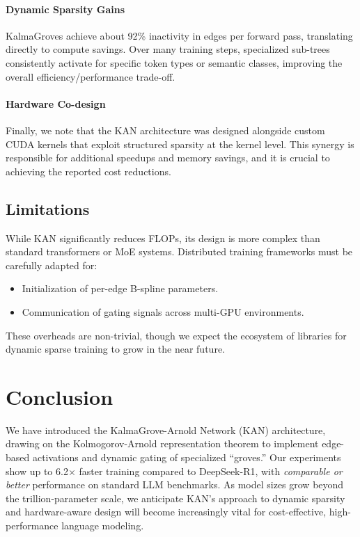 \documentclass[twocolumn]{article}
\begin{document}
\paragraph{Dynamic Sparsity Gains}
KalmaGroves achieve about 92\% inactivity in edges per forward pass, translating directly to compute savings. Over many training steps, specialized sub-trees consistently activate for specific token types or semantic classes, improving the overall efficiency/performance trade-off.

\paragraph{Hardware Co-design}
Finally, we note that the KAN architecture was designed alongside custom CUDA kernels that exploit structured sparsity at the kernel level. This synergy is responsible for additional speedups and memory savings, and it is crucial to achieving the reported cost reductions.

\subsection{Limitations}
While KAN significantly reduces FLOPs, its design is more complex than standard transformers or MoE systems. Distributed training frameworks must be carefully adapted for:
\begin{itemize}
    \item Initialization of per-edge B-spline parameters.
    \item Communication of gating signals across multi-GPU environments.
\end{itemize}

These overheads are non-trivial, though we expect the ecosystem of libraries for dynamic sparse training to grow in the near future.

\section{Conclusion}
We have introduced the KalmaGrove-Arnold Network (KAN) architecture, drawing on the Kolmogorov-Arnold representation theorem to implement edge-based activations and dynamic gating of specialized ``groves.'' Our experiments show up to 6.2$\times$ faster training compared to DeepSeek-R1, with \emph{comparable or better} performance on standard LLM benchmarks. As model sizes grow beyond the trillion-parameter scale, we anticipate KAN's approach to dynamic sparsity and hardware-aware design will become increasingly vital for cost-effective, high-performance language modeling.
\end{document}
